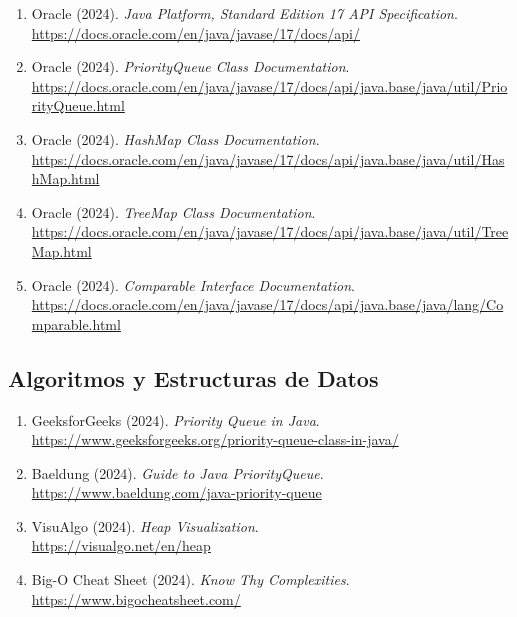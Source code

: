 \documentclass[12pt,a4paper]{article}
\begin{document}
\begin{enumerate}
    \item Oracle (2024). \textit{Java Platform, Standard Edition 17 API Specification}. \\
    \url{https://docs.oracle.com/en/java/javase/17/docs/api/}
    
    \item Oracle (2024). \textit{PriorityQueue Class Documentation}. \\
    \url{https://docs.oracle.com/en/java/javase/17/docs/api/java.base/java/util/PriorityQueue.html}
    
    \item Oracle (2024). \textit{HashMap Class Documentation}. \\
    \url{https://docs.oracle.com/en/java/javase/17/docs/api/java.base/java/util/HashMap.html}
    
    \item Oracle (2024). \textit{TreeMap Class Documentation}. \\
    \url{https://docs.oracle.com/en/java/javase/17/docs/api/java.base/java/util/TreeMap.html}
    
    \item Oracle (2024). \textit{Comparable Interface Documentation}. \\
    \url{https://docs.oracle.com/en/java/javase/17/docs/api/java.base/java/lang/Comparable.html}
\end{enumerate}

\subsection{Algoritmos y Estructuras de Datos}

\begin{enumerate}[resume]
    \item GeeksforGeeks (2024). \textit{Priority Queue in Java}. \\
    \url{https://www.geeksforgeeks.org/priority-queue-class-in-java/}
    
    \item Baeldung (2024). \textit{Guide to Java PriorityQueue}. \\
    \url{https://www.baeldung.com/java-priority-queue}
    
    \item VisuAlgo (2024). \textit{Heap Visualization}. \\
    \url{https://visualgo.net/en/heap}
    
    \item Big-O Cheat Sheet (2024). \textit{Know Thy Complexities}. \\
    \url{https://www.bigocheatsheet.com/}
\end{enumerate}
\end{document}
